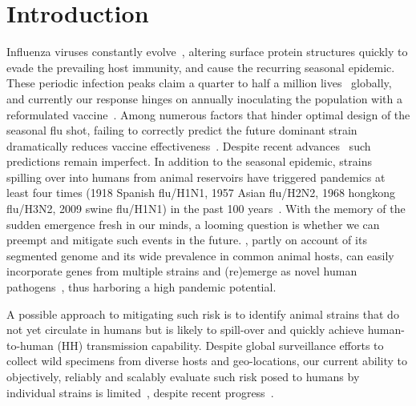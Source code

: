 \documentclass[onecolumn, compsoc,10pt]{IEEEtran}
\begin{document}
\vspace{10pt}
\section*{Introduction}
Influenza viruses constantly evolve~\cite{dos2016influenza}, altering surface protein structures quickly   to evade the prevailing host immunity, and cause the recurring seasonal  epidemic. These periodic  infection peaks claim a quarter to half a million lives~\cite{huddleston2020integrating} globally,  and currently our response hinges on annually  inoculating  the  population with a  reformulated  vaccine~\cite{boni2008vaccination,dos2016influenza}.  Among numerous factors that hinder optimal design of the seasonal flu shot, failing to correctly predict the future dominant strain  dramatically reduces vaccine effectiveness~\cite{tricco2013comparing}. Despite  recent advances~\cite{neher2014predicting,huddleston2020integrating} such predictions remain imperfect. In addition to  the seasonal  epidemic,  \infl strains spilling over into humans from animal reservoirs have triggered  pandemics  at least four times (1918 Spanish flu/H1N1, 1957 Asian flu/H2N2, 1968 hongkong flu/H3N2, 2009 swine flu/H1N1) in the past 100 years~\cite{shao2017evolution}. With the memory of the  sudden \hcov emergence
fresh in our minds, a looming question  is whether we can  preempt and mitigate such events in the future. \infl, partly on account of its segmented genome and its wide prevalence in common animal hosts, can easily incorporate genes from multiple strains and (re)emerge as novel human pathogens~\cite{reid2003origin,vergara2014ns}, thus harboring  a high pandemic potential.



A possible approach to mitigating such risk is to identify  animal strains  that do not yet circulate in humans but is likely to spill-over and quickly achieve human-to-human (HH) transmission capability. Despite global surveillance efforts to  collect wild specimens from diverse hosts and geo-locations, our  current ability to objectively, reliably and scalably  evaluate such risk posed to  humans by  individual   strains  is  limited~\cite{wille2021accurately}, despite recent progress~\cite{pulliam2009ability,grewelle2020larger,grange2021ranking}.
\end{document}
